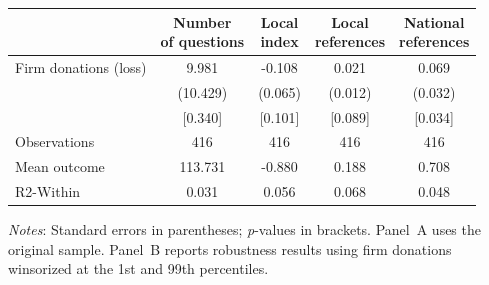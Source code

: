 \documentclass[12pt,a4paper]{article}
\begin{document}
\begin{table}[H]
{
\def\sym#1{\ifmmode^{#1}\else\(^{#1}\)\fi}
\begin{tabular}{lcccc}
\hline\hline
                & \shortstack{Number\\of questions}
                & \shortstack{Local\\index}
                & \shortstack{Local\\references}
                & \shortstack{National\\references} \\
\hline
Firm donations (loss)
                &    9.981        &   -0.108        &    0.021        &    0.069        \\
                &   (10.429)      &   (0.065)       &   (0.012)       &   (0.032)       \\
                &    [0.340]      &   [0.101]       &   [0.089]       &   [0.034]       \\
Observations    &     416         &     416         &     416         &     416         \\
Mean outcome    &   113.731       &    -0.880       &    0.188        &    0.708        \\
R2-Within       &    0.031        &    0.056        &    0.068        &    0.048        \\
\hline\hline
\end{tabular}
}

\vspace{1mm}
\begin{flushleft}
\footnotesize
\justifying
\textit{Notes}: Standard errors in parentheses; \textit{p}-values in brackets. 
Panel~A uses the original sample. 
Panel~B reports robustness results using firm donations winsorized at the 1st and 99th percentiles.
\end{flushleft}


\end{table}
\end{document}

